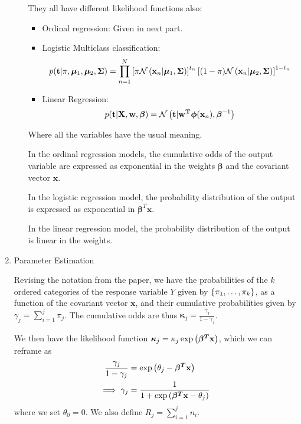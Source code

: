 \documentclass[reqno]{amsart}
\begin{document}
\begin{enumerate}[label=\textbf{(\Roman*)}]
\begin{enumerate}[label=\textbf{(\alph*)}]
           They all have different likelihood functions also:

           \begin{itemize}
            \item Ordinal regression: Given in next part.
            \item Logistic Multiclass classification: \[p(\mathbf{t}|\pi, \boldsymbol{\mu}_1, \boldsymbol{\mu}_2, \mathbf{\Sigma}) = \prod_{n = 1}^{N} \left[\pi \mathcal{N} \left(\mathbf{x}_n|\boldsymbol{\mu}_1, \mathbf{\Sigma}\right)\right]^{t_n}\left[(1 - \pi)\mathcal{N} \left(\mathbf{x}_n|\boldsymbol{\mu}_2, \mathbf{\Sigma}\right)\right]^{1 - t_n} \] 
            \item Linear Regression: \[p(\mathbf{t}|\mathbf{X, w}, \boldsymbol{\beta}) = \mathcal{N}\left(\mathbf{t}|\mathbf{w^T}\boldsymbol{\phi}(\mathbf{x}_n), \boldsymbol{\beta}^{-1}\right)\]
           \end{itemize}

           Where all the variables have the usual meaning.


        In the ordinal regression models, the cumulative odds of the output variable are expressed as exponential in the weights \(\boldsymbol{\beta}\) and the covariant vector \(\mathbf{x}\). 
        
        In the logistic regression model, the probability distribution of the output is expressed as exponential in \(\boldsymbol{\beta}^T \mathbf{x}\). 
        
        In the linear regression model, the probability distribution of the output is linear in the weights. 
           
        \end{enumerate}
        \item \question Parameter Estimation
        
        \solution
    Revising the notation from the paper, we have the probabilities of the \(k\) ordered categories of the response variable \(Y\) given by \(\left\{\pi_1, \ldots, \pi_{k}\right\}\), as a function of the covariant vector \(\mathbf{x}\), and their cumulative probabilities given by \(\displaystyle \gamma_j = \sum_{i = 1}^{j} \pi_j\). The cumulative odds are thus \(\boldsymbol{\kappa}_j = \frac{\gamma_j}{1 - \gamma_j}\).

    We then have the likelihood function \(\boldsymbol{\kappa}_j = \kappa_j \exp \left(\boldsymbol{\beta^T}\mathbf{x}\right)\), which we can reframe as \begin{align}
        \begin{split}
            \frac{\gamma_j}{1 - \gamma_j} &= \exp \left(\theta_j - \boldsymbol{\beta^T}\mathbf{x}\right) \\
            \implies \gamma_{j} &= \frac{1}{1 + \exp \left(\boldsymbol{\beta^T}\mathbf{x} - \theta_j\right)} 
        \end{split}
    \end{align}
    where we set \(\theta_0 = 0\).
    We also define \(\displaystyle R_j = \sum_{i = 1}^{j} n_i\).


\end{enumerate}
\end{document}
